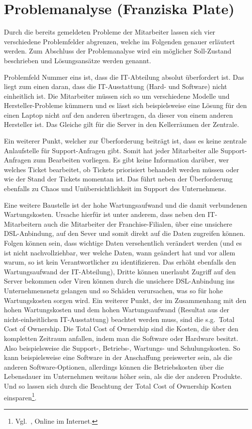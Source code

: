 \section{Problemanalyse (Franziska Plate)}

Durch die bereits gemeldeten Probleme der Mitarbeiter lassen sich vier
verschiedene Problemfelder abgrenzen, welche im Folgenden genauer
erläutert werden. Zum Abschluss der Problemanalyse wird ein möglicher
Soll-Zustand beschrieben und Lösungsansätze werden genannt.

Problemfeld Nummer eins ist, dass die IT-Abteilung absolut überfordert
ist. Das liegt zum einen daran, dass die IT-Ausstattung (Hard- und
Software) nicht einheitlich ist. Die Mitarbeiter müssen sich so um
verschiedene Modelle und Hersteller-Probleme kümmern und es lässt sich
beispielsweise eine Lösung für den einen Laptop nicht auf den anderen
übertragen, da dieser von einem anderen Hersteller ist. Das Gleiche
gilt für die Server in den Kellerräumen der Zentrale.

Ein weiterer Punkt, welcher zur Überforderung beiträgt ist, dass es
keine zentrale Anlaufstelle für Support-Anfragen gibt. Somit hat jeder
Mitarbeiter alle Support-Anfragen zum Bearbeiten vorliegen. Es gibt
keine Information darüber, wer welches Ticket bearbeitet, ob Tickets
priorisiert behandelt werden müssen oder wie der Stand der Tickets
momentan ist. Das führt neben der Überforderung ebenfalls zu Chaos und
Unübersichtlichkeit im Support des Unternehmens.

Eine weitere Baustelle ist der hohe Wartungsaufwand und die damit
verbundenen Wartungskosten. Ursache hierfür ist unter anderem, dass
neben den IT-Mitarbeitern auch die Mitarbeiter der Franchise-Filialen,
über eine unsichere DSL-Anbindung, auf den Sever und somit direkt auf
die Daten zugreifen können. Folgen können sein, dass wichtige Daten
versehentlich verändert werden (und es ist nicht nachvollziehbar, wer
welche Daten, wann geändert hat und vor allem warum, so ist kein
Verantwortlicher zu identifizieren. Das erhöht ebenfalls den
Wartungsaufwand der IT-Abteilung), Dritte können unerlaubt Zugriff auf
den Server bekommen oder Viren können durch die unsichere
DSL-Anbindung ins Unternehmensnetz gelangen und so Schäden
verursachen, was so für hohe Wartungskosten sorgen wird. Ein weiterer
Punkt, der im Zusammenhang mit den hohen Wartungskosten und dem hohen
Wartungsaufwand (Resultat aus der nicht-einheitlichen IT-Ausstattung)
beachtet werden muss, sind die s.g.~Total Cost of Ownership. Die Total
Cost of Ownership sind die Kosten, die über den kompletten Zeitraum
anfallen, indem man die Software oder Hardware besitzt. Also
beispielsweise die Support-, Betriebs-, Wartungs- und
Schulungskosten. So kann beispielsweise eine Software in der
Anschaffung preiswerter sein, als die anderen Software-Optionen,
allerdings können die Betriebskosten über die Lebensdauer im
Unternehmen weitaus höher sein, als die der anderen Produkte. Und so
lassen sich durch die Beachtung der Total Cost of Ownership Kosten
einsparen\footnote{Vgl.~\cite{TCO}, Online im Internet.}.


